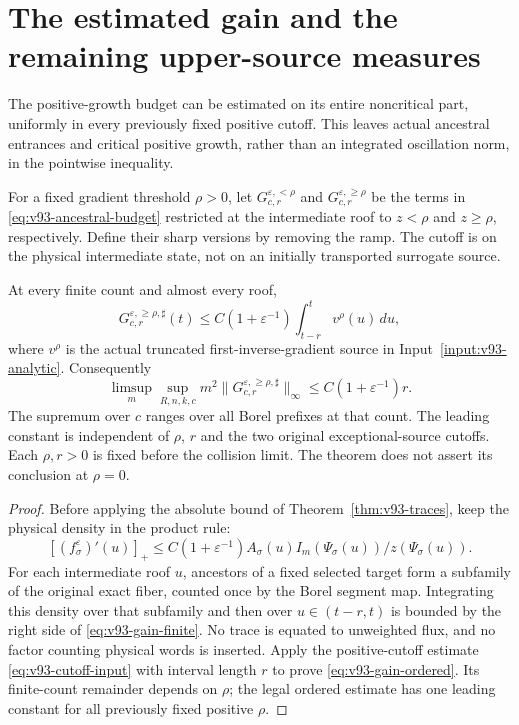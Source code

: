 \section{The estimated gain and the remaining upper-source measures}
\label{sec:v93-upper}
The positive-growth budget can be estimated on its entire noncritical
part, uniformly in every previously fixed positive cutoff. This leaves
actual ancestral entrances and critical positive growth, rather than
an integrated oscillation norm, in the pointwise inequality.

For a fixed gradient threshold $\rho>0$, let
$G_{c,r}^{\varepsilon,<\rho}$ and
$G_{c,r}^{\varepsilon,\ge\rho}$ be the terms in
\eqref{eq:v93-ancestral-budget} restricted at the intermediate roof
to $z<\rho$ and $z\ge\rho$, respectively. Define their sharp versions
by removing the ramp. The cutoff is on the physical intermediate
state, not on an initially transported surrogate source.

\begin{theorem}
\label{thm:v93-gain}
At every finite count and almost every roof,
\begin{equation}\label{eq:v93-gain-finite}
 G_{c,r}^{\varepsilon,\ge\rho,\sharp}(t)
 \le C(1+\varepsilon^{-1})\int_{t-r}^t v^\rho(u)\,du,
\end{equation}
where $v^\rho$ is the actual truncated first-inverse-gradient source
in Input~\ref{input:v93-analytic}. Consequently
\begin{equation}\label{eq:v93-gain-ordered}
 \limsup_m\sup_{R,n,k,c}m^2
       \|G_{c,r}^{\varepsilon,\ge\rho,\sharp}\|_\infty
        \le C(1+\varepsilon^{-1})r.
\end{equation}
The supremum over $c$ ranges over all Borel prefixes at that count.
The leading constant is independent of $\rho$, $r$ and the two
original exceptional-source cutoffs. Each $\rho,r>0$ is fixed before
the collision limit. The theorem does not assert its conclusion at
$\rho=0$.
\end{theorem}
\begin{proof}
Before applying the absolute bound of Theorem~\ref{thm:v93-traces},
keep the physical density in the product rule:
\[
 [(f_\sigma^\varepsilon)'(u)]_+
 \le C(1+\varepsilon^{-1})
                  A_\sigma(u)I_m(\Psi_\sigma(u))/z(\Psi_\sigma(u)).
\]
For each intermediate roof $u$, ancestors of a fixed selected target
form a subfamily of the original exact fiber, counted once by the
Borel segment map. Integrating this density over that subfamily and
then over $u\in(t-r,t)$ is bounded by the right side of
\eqref{eq:v93-gain-finite}. No trace is equated to unweighted flux,
and no factor counting physical words is inserted. Apply the
positive-cutoff estimate \eqref{eq:v93-cutoff-input} with interval
length $r$ to prove \eqref{eq:v93-gain-ordered}. Its finite-count
remainder depends on $\rho$; the legal ordered estimate has one
leading constant for all previously fixed positive $\rho$.
\end{proof}

